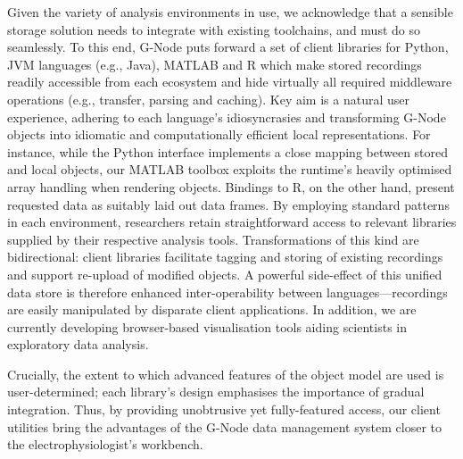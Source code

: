 \documentclass[a4paper]{article}
\begin{document}
Given the variety of analysis environments in use, we acknowledge that
a sensible storage solution needs to integrate with existing
toolchains, and must do so seamlessly. To this end, G-Node puts
forward a set of client libraries for Python, JVM languages (e.g.,
Java), MATLAB and R which make stored recordings readily accessible
from each ecosystem and hide virtually all required middleware
operations (e.g., transfer, parsing and caching). Key aim is a
natural user experience, adhering to each language's idiosyncrasies
and transforming G-Node objects into idiomatic and computationally
efficient local representations. For instance, while the Python
interface implements a close mapping between stored and local objects,
our MATLAB toolbox exploits the runtime's heavily optimised array
handling when rendering objects. Bindings to R, on the other hand,
present requested data as suitably laid out data frames. By employing
standard patterns in each environment, researchers retain
straightforward access to relevant libraries supplied by their
respective analysis tools. Transformations of this kind are
bidirectional: client libraries facilitate tagging and storing of
existing recordings and support re-upload of modified objects. A
powerful side-effect of this unified data store is therefore enhanced
inter-operability between languages---recordings are easily
manipulated by disparate client applications. In addition, we are
currently developing browser-based visualisation tools aiding
scientists in exploratory data analysis.

Crucially, the extent to which advanced features of the object model
are used is user-determined; each library's design emphasises the
importance of gradual integration. Thus, by providing unobtrusive yet
fully-featured access, our client utilities bring the advantages of
the G-Node data management system closer to the electrophysiologist's
workbench.
\end{document}
